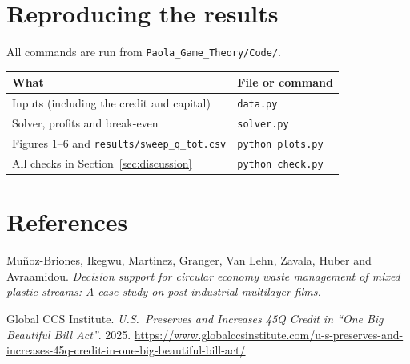 \documentclass[11pt]{article}
\begin{document}
\section{Reproducing the results}

All commands are run from \texttt{Paola\_Game\_Theory/Code/}.
\begin{center}
\small
\renewcommand{\arraystretch}{1.2}
\begin{tabular}{@{}ll@{}}
\toprule
\textbf{What} & \textbf{File or command} \\
\midrule
Inputs (including the credit and capital) & \texttt{data.py} \\
Solver, profits and break-even & \texttt{solver.py} \\
Figures 1--6 and \texttt{results/sweep\_q\_tot.csv} & \texttt{python plots.py} \\
All checks in Section~\ref{sec:discussion} & \texttt{python check.py} \\
\bottomrule
\end{tabular}
\end{center}

\section*{References}
\begin{flushleft}
\noindent Mu\~{n}oz-Briones, Ikegwu, Martinez, Granger, Van Lehn, Zavala, Huber and
Avraamidou. \emph{Decision support for circular economy waste management of mixed
plastic streams: A case study on post-industrial multilayer films.}

\medskip
\noindent Global CCS Institute. \emph{U.S.\ Preserves and Increases 45Q Credit in
``One Big Beautiful Bill Act''}. 2025.
\url{https://www.globalccsinstitute.com/u-s-preserves-and-increases-45q-credit-in-one-big-beautiful-bill-act/}
\end{flushleft}
\end{document}
